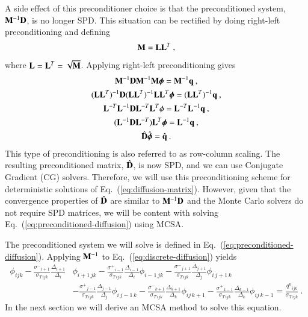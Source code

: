 \documentclass[preprint,12pt]{elsarticle}
\newcommand{\qn}{\ensuremath{q^n}}
\newcommand{\Di}{\ensuremath{\Delta_i}}
\newcommand{\Dj}{\ensuremath{\Delta_j}}
\newcommand{\Dk}{\ensuremath{\Delta_k}}
\newcommand{\sigT}{\ensuremath{\sigma_{T\,ijk}}}
\newcommand{\sigm}{\ensuremath{\sigma^{-}}}
\newcommand{\sigp}{\ensuremath{\sigma^{+}}}
\newcommand{\bphi}{\ensuremath{\boldsymbol{\phi}}}
\begin{document}
A side effect of this preconditioner choice is that the preconditioned
system, $\mathbf{M}^{-1}\mathbf{D}$, is no longer SPD.  This situation can be
rectified by doing right-left preconditioning and defining
\begin{equation}
  \mathbf{M} = \mathbf{L}\mathbf{L}^{T}\:,
\end{equation}
where $\mathbf{L} = \mathbf{L}^{T} = \sqrt{\mathbf{M}}$.  Applying right-left
preconditioning gives
\begin{equation}
  \begin{gathered}
    \ve{M}^{-1}\ve{D}\ve{M}^{-1}\ve{M}\bphi = \ve{M}^{-1}\ve{q}\:,\\
    (\ve{LL}^T)^{-1}\ve{D}(\ve{LL}^T)^{-1}\ve{LL}^T\bphi =
    (\ve{LL}^T)^{-1}\ve{q}\:, \\
    \ve{L}^{-T}\ve{L}^{-1}\ve{D}\ve{L}^{-T}\ve{L}^T\phi =
    \ve{L}^{-T}\ve{L}^{-1}\ve{q}\:,\\ 
    (\ve{L}^{-1}\ve{D}\ve{L}^{-T})\ve{L}^T\bphi = \ve{L}^{-1}\ve{q}\:,\\
    \hat{\ve{D}}\hat{\bphi} = \hat{\ve{q}}\:.
  \end{gathered}
  \label{eq:right-left-preconditioning}
\end{equation}
This type of preconditioning is also referred to as row-column
scaling.  The resulting preconditioned matrix, $\hat{\mathbf{D}}$, is now
SPD, and we can use Conjugate Gradient (CG) solvers.  Therefore, we
will use this preconditioning scheme for deterministic solutions of
Eq.~(\ref{eq:diffusion-matrix}).  However, given that the convergence
properties of $\hat{\mathbf{D}}$ are similar to $\mathbf{M}^{-1}\mathbf{D}$ and
the Monte Carlo solvers do not require SPD matrices, we will be
content with solving Eq.~(\ref{eq:preconditioned-diffusion}) using
MCSA.

The preconditioned system we will solve is defined in
Eq.~(\ref{eq:preconditioned-diffusion}).  Applying $\mathbf{M}^{-1}$ to
Eq.~(\ref{eq:discrete-diffusion}) yields
\begin{equation}
  \begin{aligned}
    \phi_{ijk} 
    - \frac{\sigm_{i+1}}{\sigT}\frac{\Delta_{i+1}}{\Di}&\phi_{i+1\,jk}
    - \frac{\sigp_{i-1}}{\sigT}\frac{\Delta_{i-1}}{\Di}\phi_{i-1\,jk}
    - \frac{\sigm_{j+1}}{\sigT}\frac{\Delta_{j+1}}{\Dj}\phi_{i\,j+1\,k} \\
    &-
    \frac{\sigp_{j-1}}{\sigT}\frac{\Delta_{j-1}}{\Dj}\phi_{i\,j-1\,k}
    - \frac{\sigm_{k+1}}{\sigT}\frac{\Delta_{k+1}}{\Dk}\phi_{ij\,k+1}
    - \frac{\sigp_{k-1}}{\sigT}\frac{\Delta_{k-1}}{\Dk}\phi_{ij\,k-1}
    = \frac{\qn_{ijk}}{\sigT}\:.
  \end{aligned}
  \label{eq:preconditioned-discrete-diffusion}
\end{equation}
In the next section we will derive an MCSA method to solve this
equation.
\end{document}
